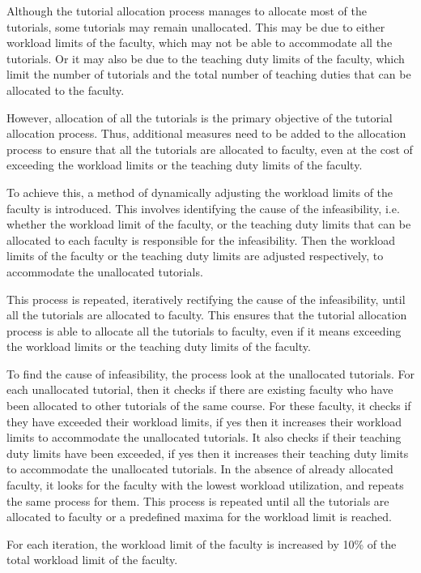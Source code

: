 Although the tutorial allocation process manages to allocate most of the tutorials, some tutorials may remain unallocated. This may be due to either workload limits of the faculty, which may not be able to accommodate all the tutorials. Or it may also be due to the teaching duty limits of the faculty, which limit the number of tutorials and the total number of teaching duties that can be allocated to the faculty.

However, allocation of all the tutorials is the primary objective of the tutorial allocation process. Thus, additional measures need to be added to the allocation process to ensure that all the tutorials are allocated to faculty, even at the cost of exceeding the workload limits or the teaching duty limits of the faculty.

To achieve this, a method of dynamically adjusting the workload limits of the faculty is introduced. This involves identifying the cause of the infeasibility, i.e. whether the workload limit of the faculty, or the teaching duty limits that can be allocated to each faculty is responsible for the infeasibility. Then the workload limits of the faculty or the teaching duty limits are adjusted respectively, to accommodate the unallocated tutorials.

This process is repeated, iteratively rectifying the cause of the infeasibility, until all the tutorials are allocated to faculty. This ensures that the tutorial allocation process is able to allocate all the tutorials to faculty, even if it means exceeding the workload limits or the teaching duty limits of the faculty.

To find the cause of infeasibility, the process look at the unallocated tutorials. For each unallocated tutorial, then it checks if there are existing faculty who have been allocated to other tutorials of the same course. For these faculty, it checks if they have exceeded their workload limits, if yes then it increases their workload limits to accommodate the unallocated tutorials. It also checks if their teaching duty limits have been exceeded, if yes then it increases their teaching duty limits to accommodate the unallocated tutorials. In the absence of already allocated faculty, it looks for the faculty with the lowest workload utilization, and repeats the same process for them. This process is repeated until all the tutorials are allocated to faculty or a predefined maxima for the workload limit is reached.

For each iteration, the workload limit of the faculty is increased by 10\% of the total workload limit of the faculty.


